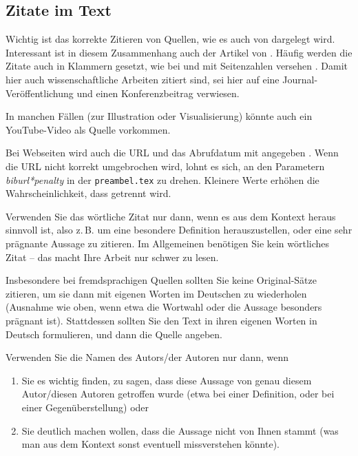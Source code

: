 \documentclass[conference,compsoc,final,a4paper]{IEEEtran}
\begin{document}
\subsection{Zitate im Text}\label{textquotes}
Wichtig ist das korrekte Zitieren von Quellen, wie es auch von \cite{Kornmeier2011} dargelegt wird. Interessant ist in diesem Zusammenhang auch der Artikel von \cite{Kramer2009}. Häufig werden die Zitate auch in Klammern gesetzt, wie bei \parencite{Kornmeier2011} und mit Seitenzahlen versehen \parencite[S. 22--24]{Kornmeier2011}.
Damit hier auch wissenschaftliche Arbeiten zitiert sind, sei hier auf eine Journal-Veröffentlichung \cite{Christidis2016} und einen Konferenzbeitrag \cite{Redmon2016} verwiesen.

In manchen Fällen (zur Illustration oder Visualisierung) könnte auch ein YouTube-Video\autocite{gronkh2019} als Quelle vorkommen.

Bei Webseiten wird auch die URL und das Abrufdatum mit angegeben \parencite{Gao2017}. Wenn die URL nicht korrekt umgebrochen wird, lohnt es sich, an den Parametern \textit{biburl*penalty} in der \texttt{preambel.tex} zu drehen. Kleinere Werte erhöhen die Wahrscheinlichkeit, dass getrennt wird.

Verwenden Sie das wörtliche Zitat nur dann, wenn es aus dem Kontext heraus sinnvoll ist, also z.\,B. um eine besondere Definition herauszustellen, oder eine sehr prägnante Aussage zu zitieren. Im Allgemeinen benötigen Sie kein wörtliches Zitat -- das macht Ihre Arbeit nur schwer zu lesen.

Insbesondere bei fremdsprachigen Quellen sollten Sie keine Original-Sätze zitieren, um sie dann mit eigenen Worten im Deutschen zu wiederholen (Ausnahme wie oben, wenn etwa die Wortwahl oder die Aussage besonders prägnant ist). Stattdessen sollten Sie den Text in ihren eigenen Worten in Deutsch formulieren, und dann die Quelle angeben.

Verwenden Sie die Namen des Autors/der Autoren nur dann, wenn

\begin{enumerate}
\item Sie es wichtig finden, zu sagen, dass diese Aussage von genau diesem Autor/diesen Autoren getroffen wurde (etwa bei einer Definition, oder bei einer Gegenüberstellung) oder
\item Sie deutlich machen wollen, dass die Aussage nicht von Ihnen stammt (was man aus dem Kontext sonst eventuell missverstehen könnte).
\end{enumerate}
\end{document}

